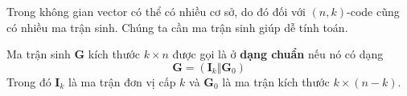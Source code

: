 Trong không gian vector có thể có nhiều cơ sở, do đó đối với $(n, k)$-code cũng có nhiều ma trận sinh. Chúng ta cần ma trận sinh giúp dễ tính toán.

\begin{definition}
    Ma trận sinh $\bm{G}$ kích thước $k \times n$ được gọi là ở \textbf{dạng chuẩn} nếu nó có dạng
    \begin{equation*}
        \bm{G} = (\bm{I}_k \Vert \bm{G}_0)
    \end{equation*}
    Trong đó $\bm{I}_k$ là ma trận đơn vị cấp $k$ và $\bm{G}_0$ là ma trận kích thước $k \times (n-k)$.
\end{definition}